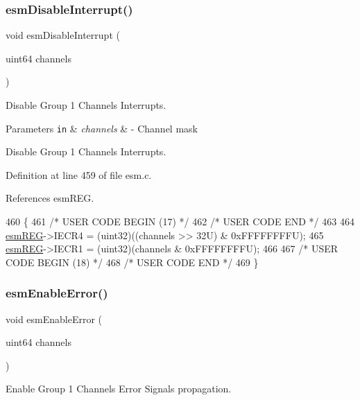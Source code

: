 \subsubsection{\texorpdfstring{esm\+Disable\+Interrupt()}{esmDisableInterrupt()}}
{\footnotesize\ttfamily void esm\+Disable\+Interrupt (\begin{DoxyParamCaption}\item[{uint64}]{channels }\end{DoxyParamCaption})}



Disable Group 1 Channels Interrupts. 


\begin{DoxyParams}[1]{Parameters}
\mbox{\tt in}  & {\em channels} & -\/ Channel mask\\
\hline
\end{DoxyParams}
Disable Group 1 Channels Interrupts. 

Definition at line 459 of file esm.\+c.



References esm\+R\+EG.


\begin{DoxyCode}
460 \{
461 \textcolor{comment}{/* USER CODE BEGIN (17) */}
462 \textcolor{comment}{/* USER CODE END */}
463 
464     \mbox{\hyperlink{reg__esm_8h_a7c2e779f2973e0c2c9496a4796df10f1}{esmREG}}->IECR4 = (uint32)((channels >> 32U) & 0xFFFFFFFFU);
465     \mbox{\hyperlink{reg__esm_8h_a7c2e779f2973e0c2c9496a4796df10f1}{esmREG}}->IECR1 = (uint32)(channels & 0xFFFFFFFFU);
466 
467 \textcolor{comment}{/* USER CODE BEGIN (18) */}
468 \textcolor{comment}{/* USER CODE END */}
469 \}
\end{DoxyCode}
\mbox{\label{group__ESM_ga918dbc559401efc341d6b1cc1fa5a5c2}} 
\subsubsection{\texorpdfstring{esm\+Enable\+Error()}{esmEnableError()}}
{\footnotesize\ttfamily void esm\+Enable\+Error (\begin{DoxyParamCaption}\item[{uint64}]{channels }\end{DoxyParamCaption})}



Enable Group 1 Channels Error Signals propagation. 


